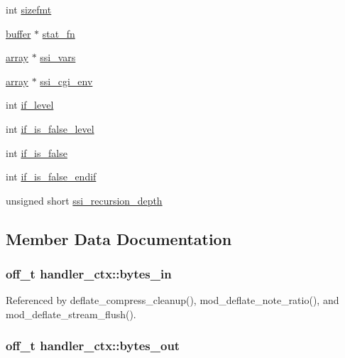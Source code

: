 \begin{DoxyCompactItemize}
int \hyperlink{structhandler__ctx_a2d9f398ea05f04186f26e30661c735bc}{sizefmt}
\item 
\hyperlink{structbuffer}{buffer} $\ast$ \hyperlink{structhandler__ctx_a8ae46226d68013df9892f006c1c3c8c9}{stat\-\_\-fn}
\item 
\hyperlink{structarray}{array} $\ast$ \hyperlink{structhandler__ctx_a28b63088e2d58e4b41b65ef38e390eed}{ssi\-\_\-vars}
\item 
\hyperlink{structarray}{array} $\ast$ \hyperlink{structhandler__ctx_a2ccb015ec36c9f4b33f232c5572d7cfd}{ssi\-\_\-cgi\-\_\-env}
\item 
int \hyperlink{structhandler__ctx_a668a96408a12ccc692848f17b829397e}{if\-\_\-level}
\item 
int \hyperlink{structhandler__ctx_a6c521a4000520e16da5c01e15d113df1}{if\-\_\-is\-\_\-false\-\_\-level}
\item 
int \hyperlink{structhandler__ctx_ad6d0498d59395fecd55e1390c771d851}{if\-\_\-is\-\_\-false}
\item 
int \hyperlink{structhandler__ctx_af6890f2bbf1f9f5e4aab68efba0f0cb2}{if\-\_\-is\-\_\-false\-\_\-endif}
\item 
unsigned short \hyperlink{structhandler__ctx_af075fb2ccd8e1c33cca00440ed2155e5}{ssi\-\_\-recursion\-\_\-depth}
\end{DoxyCompactItemize}


\subsection{Member Data Documentation}
\hypertarget{structhandler__ctx_a5f831f4f1bdc46b1e97f2e2f5fcd3c5d}{
\subsubsection[{bytes\-\_\-in}]{\setlength{\rightskip}{0pt plus 5cm}off\-\_\-t handler\-\_\-ctx\-::bytes\-\_\-in}}\label{structhandler__ctx_a5f831f4f1bdc46b1e97f2e2f5fcd3c5d}


Referenced by deflate\-\_\-compress\-\_\-cleanup(), mod\-\_\-deflate\-\_\-note\-\_\-ratio(), and mod\-\_\-deflate\-\_\-stream\-\_\-flush().

\hypertarget{structhandler__ctx_a92d3dd181f7fc83cac2a9b83bd1ee9c1}{
\subsubsection[{bytes\-\_\-out}]{\setlength{\rightskip}{0pt plus 5cm}off\-\_\-t handler\-\_\-ctx\-::bytes\-\_\-out}}\label{structhandler__ctx_a92d3dd181f7fc83cac2a9b83bd1ee9c1}


